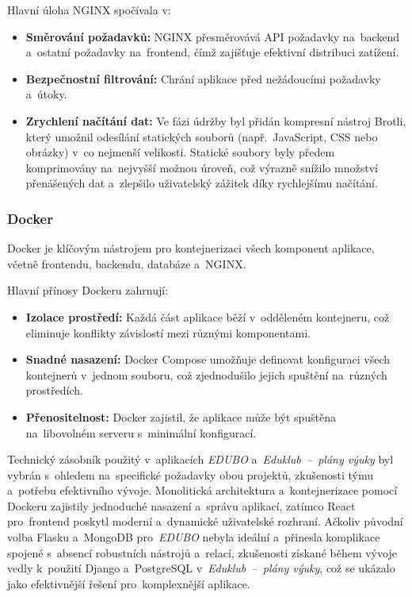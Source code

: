 \documentclass[male,czech,api_bc]{kitheses}
\begin{document}
Hlavní úloha NGINX spočívala v:
\begin{itemize}
	\item \textbf{Směrování požadavků:} NGINX přesměrovává API požadavky na~backend a~ostatní požadavky na~frontend, čímž zajišťuje efektivní distribuci zatížení.
	\item \textbf{Bezpečnostní filtrování:} Chrání aplikace před nežádoucími požadavky a~útoky.
	\item \textbf{Zrychlení načítání dat:} Ve fázi údržby byl přidán kompresní nástroj Brotli, který umožnil odesílání statických souborů (např.~JavaScript, CSS nebo obrázky) v~co nejmenší velikosti. Statické soubory byly předem komprimovány na~nejvyšší možnou úroveň, což výrazně snížilo množství přenášených dat a~zlepšilo uživatelský zážitek díky rychlejšímu načítání.
\end{itemize}

\subsubsection{Docker}

Docker je klíčovým nástrojem pro kontejnerizaci všech komponent aplikace, včetně frontendu, backendu, databáze a~NGINX.

Hlavní přínosy Dockeru zahrnují:
\begin{itemize}
	\item \textbf{Izolace prostředí:} Každá část aplikace běží v~odděleném kontejneru, což eliminuje konflikty závislostí mezi různými komponentami.
	\item \textbf{Snadné nasazení:} Docker Compose umožňuje definovat konfiguraci všech kontejnerů v~jednom souboru, což zjednodušilo jejich spuštění na~různých prostředích.
	\item \textbf{Přenositelnost:} Docker zajistil, že aplikace může být spuštěna na~libovolném serveru s~minimální konfigurací.
\end{itemize}

Technický zásobník použitý v~aplikacích \textit{EDUBO} a~\textit{Eduklub~--~plány výuky} byl vybrán s~ohledem na~specifické požadavky obou projektů, zkušenosti týmu a~potřebu efektivního vývoje. Monolitická architektura a~kontejnerizace pomocí Dockeru zajistily jednoduché nasazení a~správu aplikací, zatímco React pro~frontend poskytl moderní a~dynamické uživatelské rozhraní. Ačkoliv původní volba Flasku a~MongoDB pro~\textit{EDUBO} nebyla ideální a~přinesla komplikace spojené s~absencí robustních nástrojů a~relací, zkušenosti získané během vývoje vedly k~použití Django a~PostgreSQL v~\textit{Eduklub~--~plány výuky}, což se ukázalo jako efektivnější řešení pro~komplexnější aplikace.
\end{document}
